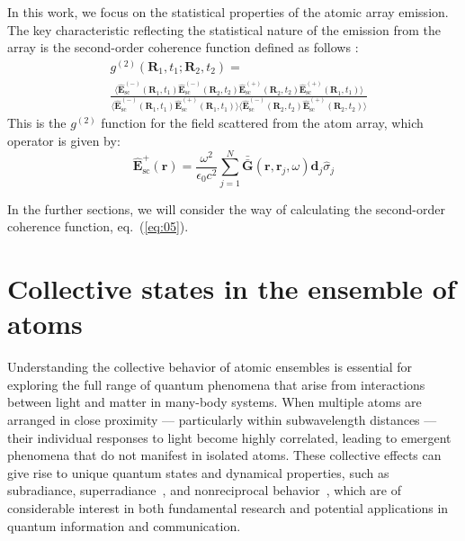 \documentclass[aps,prl,twocolumn,superscriptaddress,showpacs,amsmath,amssymb]{revtex4-2}
\begin{document}
In this work, we focus on the statistical properties of the atomic array emission. 
The key characteristic reflecting the statistical nature of the emission from the array is the second-order coherence function defined as follows \cite{mandel1995optical}:
\begin{align}
    & g^{(2)}(\mathbf{R}_1, t_1; \mathbf{R}_2, t_2) = \nonumber \\ 
    & \frac{\langle \hat{\mathbf{E}}_\mathrm{sc}^{(-)} (\mathbf{R}_1, t_1) \hat{\mathbf{E}}_\mathrm{sc}^{(-)} (\mathbf{R}_2, t_2) \hat{\mathbf{E}}_\mathrm{sc}^{(+)} (\mathbf{R}_2, t_2) \hat{\mathbf{E}}_\mathrm{sc}^{(+)} (\mathbf{R}_1, t_1)\rangle}{\langle
    \hat{\mathbf{E}}_\mathrm{sc}^{(-)} (\mathbf{R}_1, t_1) \hat{\mathbf{E}}_\mathrm{sc}^{(+)} (\mathbf{R}_1, t_1) \rangle \langle \hat{\mathbf{E}}_\mathrm{sc}^{(-)} (\mathbf{R}_2, t_2) \hat{\mathbf{E}}_\mathrm{sc}^{(+)} (\mathbf{R}_2, t_2) \rangle} 
    \label{eq:05}
\end{align}
This is the $g^{(2)}$ function for the field scattered from the atom array, which operator is given by:
\begin{equation} 
    \hat{\mathbf{E}}_\mathrm{sc}^+(\mathbf{r}) = \frac{\omega^2}{\epsilon_0 c^2} \sum_{j=1}^N \bar{\bar{\mathbf{G}}}(\mathbf{r}, \mathbf{r}_j, \omega) \mathbf{d}_j \hat{\sigma}_j
    \label{eq:06}
\end{equation}

In the further sections, we will consider the way of calculating the second-order coherence function, eq.~(\ref{eq:05}).

\section{Collective states in the ensemble of atoms}

Understanding the collective behavior of atomic ensembles is essential for exploring the full range of quantum phenomena that arise from interactions between light and matter in many-body systems. 
When multiple atoms are arranged in close proximity --- particularly within subwavelength distances --- their individual responses to light become highly correlated, leading to emergent phenomena that do not manifest in isolated atoms. 
These collective effects can give rise to unique quantum states and dynamical properties, such as subradiance, superradiance~\cite{gross1982superradiance, nefedkin2017superradiance, masson2024dicke}, and nonreciprocal behavior~\cite{hamann2018nonreciprocity,zhang2018thermal, nefedkin2023nonreciprocal}, which are of considerable interest in both fundamental research and potential applications in quantum information and communication.
\end{document}
